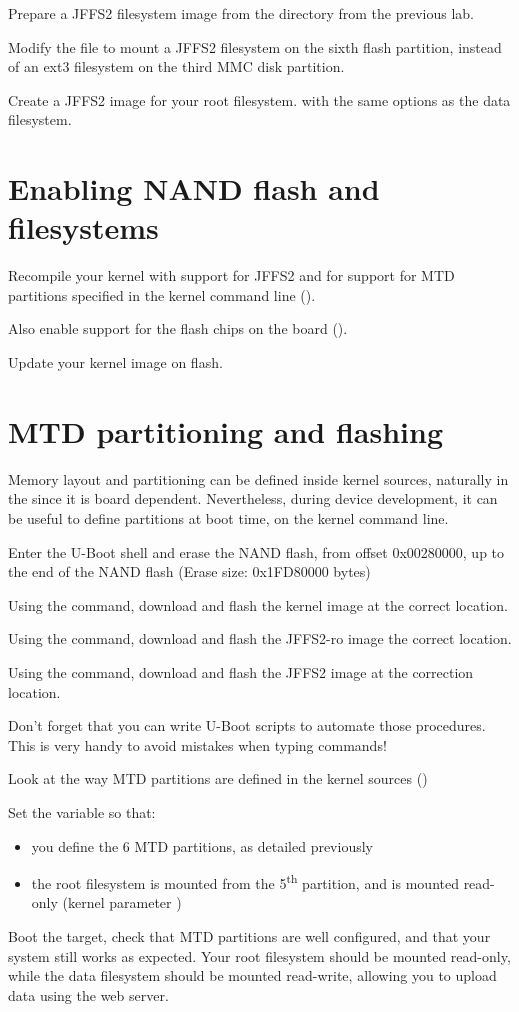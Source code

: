 Prepare a JFFS2 filesystem image from the 
directory from the previous lab.

Modify the  file to mount a JFFS2 filesystem on
the sixth flash partition, instead of an ext3 filesystem on the third
MMC disk partition.

Create a JFFS2 image for your root filesystem. with the same options
as the data filesystem.

\section{Enabling NAND flash and filesystems}

Recompile your kernel with support for JFFS2 and for support for MTD
partitions specified in the kernel command line
().

Also enable support for the flash chips on the board
().

Update your kernel image on flash.

\section{MTD partitioning and flashing}

Memory layout and partitioning can be defined inside kernel sources,
naturally in the  since it is
board dependent. Nevertheless, during device development, it can be
useful to define partitions at boot time, on the kernel command line.

Enter the U-Boot shell and erase the NAND flash, from offset
0x00280000, up to the end of the NAND flash (Erase size: 0x1FD80000
bytes)

Using the  command, download and flash the kernel image at
the correct location.

Using the  command, download and flash the JFFS2-ro image
the correct location.

Using the  command, download and flash the JFFS2 image at
the correction location.

Don't forget that you can write U-Boot scripts to automate those
procedures. This is very handy to avoid mistakes when typing commands!

Look at the way MTD partitions are defined in the kernel sources
()

Set the  variable so that:

\begin{itemize}
\item you define the 6 MTD partitions, as detailed previously
\item the root filesystem is mounted from the 5\textsuperscript{th}
  partition, and is mounted read-only (kernel parameter )
\end{itemize}

Boot the target, check that MTD partitions are well configured, and
that your system still works as expected. Your root filesystem should
be mounted read-only, while the data filesystem should be mounted
read-write, allowing you to upload data using the web server.
